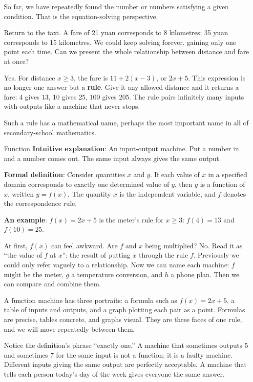 So far, we have repeatedly found the number or numbers satisfying a given condition. That is the equation-solving perspective.

Return to the taxi. A fare of 21 yuan corresponds to 8 kilometres; 35 yuan corresponds to 15 kilometres. We could keep solving forever, gaining only one point each time. Can we present the whole relationship between distance and fare at once?

Yes. For distance $x \geq 3$, the fare is $11 + 2(x - 3)$, or $2x + 5$. This expression is no longer one answer but a \textbf{rule}. Give it any allowed distance and it returns a fare: 4 gives 13, 10 gives 25, 100 gives 205. The rule pairs infinitely many inputs with outputs like a machine that never stops.

Such a rule has a mathematical name, perhaps the most important name in all of secondary-school mathematics.

\begin{shuyu}{Function}
\textbf{Intuitive explanation}: An input-output machine. Put a number in and a number comes out. The same input always gives the same output.

\textbf{Formal definition}: Consider quantities $x$ and $y$. If each value of $x$ in a specified domain corresponds to exactly one determined value of $y$, then $y$ is a function of $x$, written $y = f(x)$. The quantity $x$ is the independent variable, and $f$ denotes the correspondence rule.

\textbf{An example}: $f(x) = 2x + 5$ is the meter's rule for $x \geq 3$: $f(4) = 13$ and $f(10) = 25$.
\end{shuyu}

At first, $f(x)$ can feel awkward. Are $f$ and $x$ being multiplied? No. Read it as ``the value of $f$ at $x$'': the result of putting $x$ through the rule $f$. Previously we could only refer vaguely to a relationship. Now we can name each machine: $f$ might be the meter, $g$ a temperature conversion, and $h$ a phone plan. Then we can compare and combine them.

A function machine has three portraits: a formula such as $f(x) = 2x + 5$, a table of inputs and outputs, and a graph plotting each pair as a point. Formulas are precise, tables concrete, and graphs visual. They are three faces of one rule, and we will move repeatedly between them.

Notice the definition's phrase ``exactly one.'' A machine that sometimes outputs 5 and sometimes 7 for the same input is not a function; it is a faulty machine. Different inputs giving the same output are perfectly acceptable. A machine that tells each person today's day of the week gives everyone the same answer.

